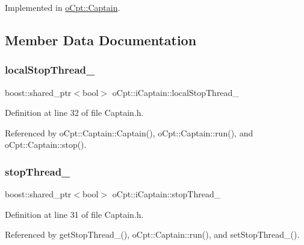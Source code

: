 Implemented in \hyperlink{classo_cpt_1_1_captain_aa8a3923b961f4bc2ebc857895f759711}{o\+Cpt\+::\+Captain}.



\subsection{Member Data Documentation}
\hypertarget{classo_cpt_1_1i_captain_aaa8f3eba679429337bc7078a8c1a45ac}{}\label{classo_cpt_1_1i_captain_aaa8f3eba679429337bc7078a8c1a45ac} 
\subsubsection{\texorpdfstring{local\+Stop\+Thread\+\_\+}{localStopThread\_}}
{\footnotesize\ttfamily boost\+::shared\+\_\+ptr$<$bool$>$ o\+Cpt\+::i\+Captain\+::local\+Stop\+Thread\+\_\+\hspace{0.3cm}{\ttfamily [protected]}}



Definition at line 32 of file Captain.\+h.



Referenced by o\+Cpt\+::\+Captain\+::\+Captain(), o\+Cpt\+::\+Captain\+::run(), and o\+Cpt\+::\+Captain\+::stop().

\hypertarget{classo_cpt_1_1i_captain_a867451cb05e5073d61c0b6a2d0e7389c}{}\label{classo_cpt_1_1i_captain_a867451cb05e5073d61c0b6a2d0e7389c} 
\subsubsection{\texorpdfstring{stop\+Thread\+\_\+}{stopThread\_}}
{\footnotesize\ttfamily boost\+::shared\+\_\+ptr$<$bool$>$ o\+Cpt\+::i\+Captain\+::stop\+Thread\+\_\+\hspace{0.3cm}{\ttfamily [protected]}}



Definition at line 31 of file Captain.\+h.



Referenced by get\+Stop\+Thread\+\_\+(), o\+Cpt\+::\+Captain\+::run(), and set\+Stop\+Thread\+\_\+().

